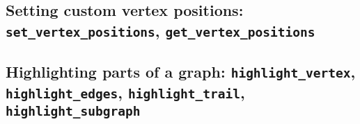 \documentclass[a4paper,11pt]{article}
\begin{document}
\subsection{Setting custom vertex positions: {\tt set\_vertex\_positions}, {\tt get\_vertex\_positions}}

\subsection{Highlighting parts of a graph: {\tt highlight\_vertex}, {\tt highlight\_edges}, {\tt highlight\_trail}, {\tt highlight\_subgraph}}
\end{document}
